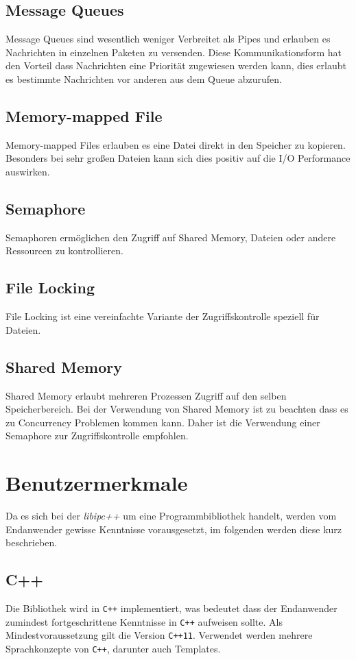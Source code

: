 \documentclass[a4paper]{book}
\begin{document}
\subsection{Message Queues}
Message Queues sind wesentlich weniger Verbreitet als Pipes und erlauben es Nachrichten in einzelnen Paketen zu versenden. Diese Kommunikationsform hat den Vorteil dass Nachrichten eine Priorität zugewiesen werden kann, dies erlaubt es bestimmte Nachrichten vor anderen aus dem Queue abzurufen.

\subsection{Memory-mapped File}
Memory-mapped Files erlauben es eine Datei direkt in den Speicher zu kopieren. Besonders bei sehr großen Dateien kann sich dies positiv auf die I/O Performance auswirken.

\subsection{Semaphore}
Semaphoren ermöglichen den Zugriff auf Shared Memory, Dateien oder andere Ressourcen zu kontrollieren. 

\subsection{File Locking}
File Locking ist eine vereinfachte Variante der Zugriffskontrolle speziell für Dateien.


\subsection{Shared Memory}
Shared Memory erlaubt mehreren Prozessen Zugriff auf den selben Speicherbereich. Bei der Verwendung von Shared Memory ist zu beachten dass es zu Concurrency Problemen kommen kann. Daher ist die Verwendung einer Semaphore zur Zugriffskontrolle empfohlen.

\section{Benutzermerkmale}
Da es sich bei der \textit{libipc++} um eine Programmbibliothek handelt, werden vom Endanwender gewisse Kenntnisse vorausgesetzt, im folgenden werden diese kurz beschrieben.

\subsection{C++}
Die Bibliothek wird in \texttt{C++} implementiert, was bedeutet dass der Endanwender zumindest fortgeschrittene Kenntnisse in \texttt{C++} aufweisen sollte. Als Mindestvoraussetzung gilt die Version \texttt{C++11}. Verwendet werden mehrere Sprachkonzepte von \texttt{C++}, darunter auch Templates.
\end{document}
